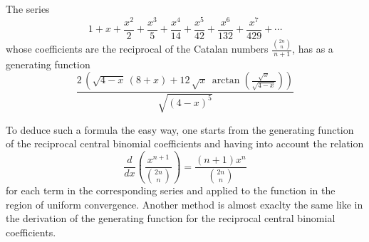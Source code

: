 \documentclass[12pt]{article}
\begin{document}
The series 
$$1+x+\frac{x^2}{2}+\frac{x^3}{5}+\frac{x^4}{14}+\frac{x^5}{42}+\frac{x^6}{132}+\frac{x^7}{429}+\cdots$$ 
whose coefficients are the reciprocal of the Catalan numbers $\frac{{2n\choose n}}{n+1}$, has as a generating function $$\frac{2\,\left( {\sqrt{4-x}}\,\left(8+x\right)+12\,{\sqrt{x}}\,\arctan (\frac{{\sqrt{x}}}{{\sqrt{4 - x}}}) \right) }{\sqrt{\left( 4 - x \right)^5}}$$

To deduce such a formula the easy way, one starts from the generating function of the reciprocal central binomial coefficients and having into account the relation
$$\frac{d}{dx}\left(\frac{x^{n+1}}{{2n\choose n}}\right)=\frac{(n+1)x^n}{{2n\choose n}}$$
for each term in the corresponding series and applied to the function in the region of uniform convergence.
Another method is almost exaclty the same like in the derivation of the generating function for the reciprocal central binomial coefficients.
\end{document}

